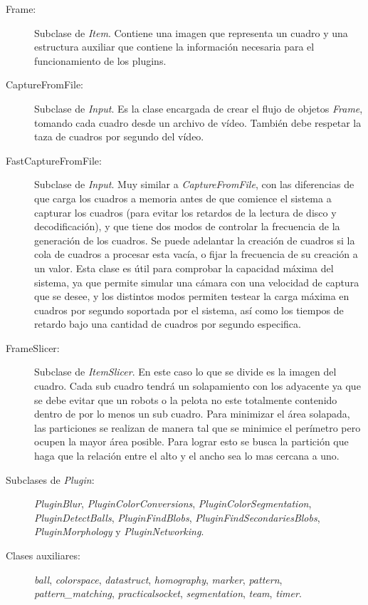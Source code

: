 \begin{description}

\item[Frame:] Subclase de \emph{Item}. Contiene una imagen que representa un
	cuadro y una estructura auxiliar que contiene la información necesaria
	para el funcionamiento de los plugins.

\item[CaptureFromFile:] Subclase de \emph{Input}. Es la clase encargada de crear
	el flujo de objetos \emph{Frame}, tomando cada cuadro desde un archivo
	de vídeo. También debe respetar la taza de cuadros por segundo del
	vídeo.

\item[FastCaptureFromFile:] Subclase de \emph{Input}. Muy similar a
	\emph{CaptureFromFile}, con las diferencias de que carga los cuadros a
	memoria antes de que comience el sistema a capturar los cuadros (para
	evitar los retardos de la lectura de disco y decodificación), y que
	tiene dos modos de controlar la frecuencia de la generación de los
	cuadros. Se puede adelantar la creación de cuadros si la cola de cuadros
	a procesar esta vacía, o fijar la frecuencia de su creación a un valor.
	Esta clase es útil para comprobar la capacidad máxima del sistema, ya
	que permite simular una cámara con una velocidad de captura que se
	desee, y los distintos modos permiten testear la carga máxima en cuadros
	por segundo soportada por el sistema, así como los tiempos de retardo
	bajo una cantidad de cuadros por segundo especifica.

\item[FrameSlicer:] Subclase de \emph{ItemSlicer}. En este caso lo que se divide
	es la imagen del cuadro. Cada sub cuadro tendrá un solapamiento con los
	adyacente ya que se debe evitar que un robots o la pelota no este
	totalmente contenido dentro de por lo menos un sub cuadro. Para
	minimizar el área solapada, las particiones se realizan de manera tal
	que se minimice el perímetro pero ocupen la mayor área posible. Para
	lograr esto se busca la partición que haga que la relación entre el alto
	y el ancho sea lo mas cercana a uno.

\item[Subclases de \emph{Plugin}:] \emph{PluginBlur},
	\emph{PluginColorConversions}, \emph{PluginColorSegmentation},
	\emph{PluginDetectBalls}, \emph{PluginFindBlobs},
	\emph{PluginFindSecondariesBlobs}, \emph{PluginMorphology} y
	\emph{PluginNetworking}.

\item[Clases auxiliares:] \emph{ball}, \emph{colorspace}, \emph{datastruct},
	\emph{homography}, \emph{marker}, \emph{pattern},
	\emph{pattern\_matching}, \emph{practicalsocket}, \emph{segmentation},
	\emph{team}, \emph{timer}.

\end{description}


